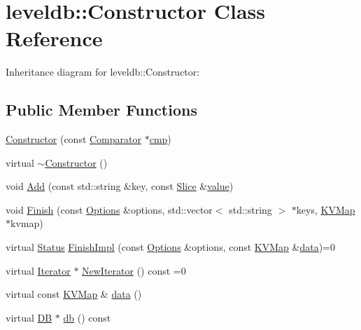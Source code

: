 \hypertarget{classleveldb_1_1_constructor}{}\section{leveldb\+:\+:Constructor Class Reference}
\label{classleveldb_1_1_constructor}


Inheritance diagram for leveldb\+:\+:Constructor\+:
\subsection*{Public Member Functions}
\begin{DoxyCompactItemize}
\item 
\hyperlink{classleveldb_1_1_constructor_a5f4d21512e279769e881b2ae85129f08}{Constructor} (const \hyperlink{structleveldb_1_1_comparator}{Comparator} $\ast$\hyperlink{table__test_8cc_a87863e435922f0910ca8db43f02a6c0b}{cmp})
\item 
virtual \hyperlink{classleveldb_1_1_constructor_a643f9e1fc58b988f41b2a081398b04a1}{$\sim$\+Constructor} ()
\item 
void \hyperlink{classleveldb_1_1_constructor_a5bb35f87d196065b8357200922aae69f}{Add} (const std\+::string \&key, const \hyperlink{classleveldb_1_1_slice}{Slice} \&\hyperlink{cache_8cc_a0f61d63b009d0880a89c843bd50d8d76}{value})
\item 
void \hyperlink{classleveldb_1_1_constructor_a5c7f63378f8834cac3be93040e0e49fc}{Finish} (const \hyperlink{structleveldb_1_1_options}{Options} \&options, std\+::vector$<$ std\+::string $>$ $\ast$keys, \hyperlink{namespaceleveldb_aac1e50450147be263e08252c6700f7a7}{K\+V\+Map} $\ast$kvmap)
\item 
virtual \hyperlink{classleveldb_1_1_status}{Status} \hyperlink{classleveldb_1_1_constructor_a0f11e251cfbe990b5b0a4e7040923189}{Finish\+Impl} (const \hyperlink{structleveldb_1_1_options}{Options} \&options, const \hyperlink{namespaceleveldb_aac1e50450147be263e08252c6700f7a7}{K\+V\+Map} \&\hyperlink{classleveldb_1_1_constructor_a55a0363200d6e86d8beb3b15b75e3824}{data})=0
\item 
virtual \hyperlink{classleveldb_1_1_iterator}{Iterator} $\ast$ \hyperlink{classleveldb_1_1_constructor_a362b24b7194f605b655f5a136e0ae43c}{New\+Iterator} () const =0
\item 
virtual const \hyperlink{namespaceleveldb_aac1e50450147be263e08252c6700f7a7}{K\+V\+Map} \& \hyperlink{classleveldb_1_1_constructor_a55a0363200d6e86d8beb3b15b75e3824}{data} ()
\item 
virtual \hyperlink{classleveldb_1_1_d_b}{D\+B} $\ast$ \hyperlink{classleveldb_1_1_constructor_a207d6002cdb7ead23cecf6cfb4350a80}{db} () const 
\end{DoxyCompactItemize}


